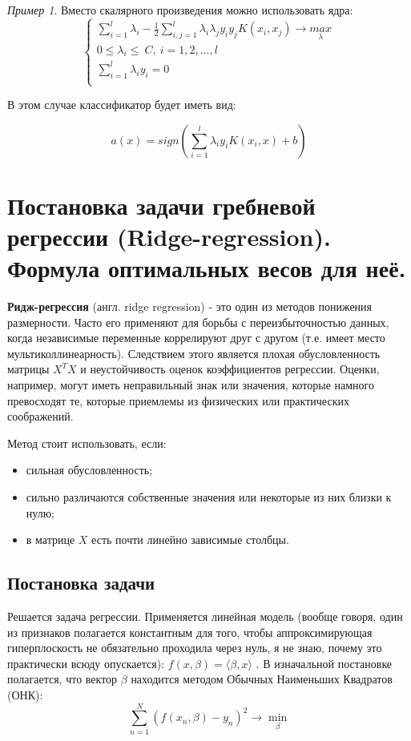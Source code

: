 \documentclass[a4paper, 12pt]{article}
\theoremstyle{plain} %
\theoremstyle{definition} %
\theoremstyle{remark} %
\newtheorem{example}{Пример}
\begin{document}
\begin{example}
Вместо скалярного произведения можно использовать ядра:
\[
	\begin{cases} \sum_{i=1}^{l} \lambda_i - \frac{1}{2} \sum_{i,j=1}^{l} \lambda_i \lambda_j y_i y_j K(x_i,x_j) \rightarrow \underset{\lambda}{max} \\ 0 \le \lambda_i \le\ C,\ i=1,2,...,l \\ \sum_{i=1}^{l} \lambda_i y_i = 0 \\ \end{cases}
\]


В этом случае классификатор будет иметь вид:

\[
	a(x)= sign(\sum_{i=1}^{l} \lambda_i y_i K(x_i, x) + b)
\]


\section{Постановка задачи гребневой регрессии (Ridge-regression). Формула оптимальных весов для неё.}

\textbf{Ридж-регрессия} (англ. ridge regression) - это один из методов понижения размерности. Часто его применяют для борьбы с переизбыточностью данных, когда независимые переменные коррелируют друг с другом (т.е. имеет место мультиколлинеарность). Следствием этого является плохая обусловленность матрицы $X^T X$ и неустойчивость оценок коэффициентов регрессии. Оценки, например, могут иметь неправильный знак или значения, которые намного превосходят те, которые приемлемы из физических или практических соображений.

Метод стоит использовать, если:
\begin{itemize}
	\item сильная обусловленность;
	\item сильно различаются собственные значения или некоторые из них близки к нулю;
	\item в матрице $X$ есть почти линейно зависимые столбцы.
\end{itemize}

\subsection{Постановка задачи}

Решается задача регрессии. Применяется линейная модель (вообще говоря, один из признаков полагается константным для того, чтобы аппроксимирующая гиперплоскость не обязательно проходила через нуль, я не знаю, почему это практически всюду опускается): $  f(x, \beta) = \langle\beta, x\rangle  $
. В изначальной постановке полагается, что вектор $\beta$
 находится методом Обычных Наименьших Квадратов (ОНК):
 \[
 	\sum_{n = 1}^{N} (f(x_n, \beta) - y_n)^2 \longrightarrow \min_{\displaystyle \beta}
\]



\end{example}
\end{document}
